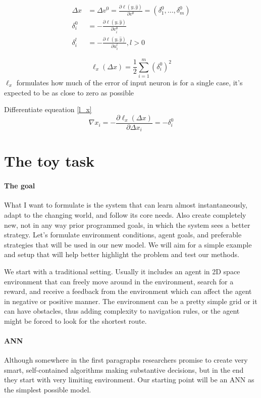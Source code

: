 \documentclass[draft]{article}
\begin{document}
\begin{align}
\Delta x &= \Delta v^0 = \frac{\partial \ell(y,\hat y)}{\partial v^0} = \left(\delta_1^0,\dots,\delta_m^0 \right) \\
\delta_i^0 &= - \frac{\partial \ell(y, \hat y)}{\partial v_i^0} \\
\delta_i^l &= - \frac{\partial \ell(y, \hat y)}{\partial u_i^l}, l>0
\end{align}

\begin{equation}\label{l_x}
\ell_x(\Delta x) = \frac{1}{2} \sum_{i=1}^{m}(\delta_i^0)^2
\end{equation}
$\ell_x$ formulates how much of the error of input neuron is for a single case, it's expected to be as close to zero as possible

Differentiate equeation \eqref{l_x}
\begin{equation}
\nabla x_i = -\frac{\partial \ell_x(\Delta x)}{\partial \Delta x_i} = - \delta_i^0
\end{equation}



\section{The toy task}

\paragraph{The goal}
What I want to formulate is the system that can learn almost instantaneously, adapt to the changing world, and follow its core needs. Also create completely new, not in any way prior programmed goals, in which the system sees a better strategy. Let’s formulate environment conditions, agent goals, and preferable strategies that will be used in our new model. We will aim for a simple example and setup that will help better highlight the problem and test our methods.

We start with a traditional setting. Usually it includes an agent in 2D space environment that can freely move around in the environment, search for a reward, and receive a feedback from the environment which can affect the agent in negative or positive manner. The environment can be a pretty simple grid or it can have obstacles, thus adding complexity to navigation rules, or the agent might be forced to look for the shortest route.

\paragraph{ANN}
Although somewhere in the first paragraphs researchers promise to create very smart, self-contained algorithms making substantive decisions, but in the end they start with very limiting environment. Our starting point will be an ANN as the simplest possible model.
\end{document}
